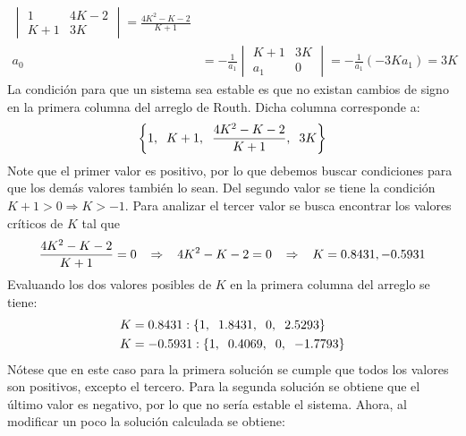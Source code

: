 \documentclass[11pt, spanish]{article}
\begin{document}
\begin{description}
\begin{align*}
\begin{vmatrix}
					1 & 4K-2\\
					K+1 & 3K
				\end{vmatrix} = \frac{4K^2-K-2}{K+1}\\
				a_0 &= -\frac{1}{a_1}
				\begin{vmatrix}
					K+1 & 3K\\
					a_1 & 0
				\end{vmatrix} = -\frac{1}{a_1}(-3K a_1) = 3K
			\end{align*}
			La condición para que un sistema sea estable es que no existan cambios de signo en la primera columna del arreglo de Routh. Dicha columna corresponde a:
			\begin{equation*}
					\left\{1,\hspace*{2mm} K+1,\hspace*{2mm} \frac{4K^2-K-2}{K+1},\hspace*{2mm} 3K\right\}
			\end{equation*}
			Note que el primer valor es positivo, por lo que debemos buscar condiciones para que los demás valores también lo sean. Del segundo valor se tiene la condición $K+1 > 0 \Rightarrow K>-1$. Para analizar el tercer valor se busca encontrar los valores críticos de $K$ tal que
			\begin{equation*}
				\frac{4K^2-K-2}{K+1} = 0\hspace*{3mm} \Rightarrow\hspace*{3mm} 4K^2-K-2=0\hspace*{3mm} \Rightarrow\hspace*{3mm} K = {0.8431, -0.5931}
			\end{equation*}
			Evaluando los dos valores posibles de $K$ en la primera columna del arreglo se tiene:
			\begin{align*}
				K &= 0.8431: \{1,\hspace*{2mm} 1.8431,\hspace*{2mm} 0,\hspace*{2mm} 2.5293\}\\
				K &= -0.5931: \{1,\hspace*{2mm} 0.4069,\hspace*{2mm} 0,\hspace*{2mm} -1.7793\}
			\end{align*}
			Nótese que en este caso para la primera solución se cumple que todos los valores son positivos, excepto el tercero. Para la segunda solución se obtiene que el último valor es negativo, por lo que no sería estable el sistema. Ahora, al modificar un poco la solución calculada se obtiene:

\end{description}
\end{document}
